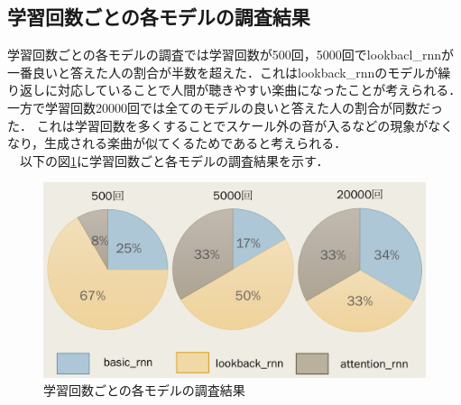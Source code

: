 \subsection{学習回数ごとの各モデルの調査結果}
学習回数ごとの各モデルの調査では学習回数が500回，5000回でlookbacl\_rnnが一番良いと答えた人の割合が半数を超えた．これはlookback\_rnnのモデルが繰り返しに対応していることで人間が聴きやすい楽曲になったことが考えられる．一方で学習回数20000回では全てのモデルの良いと答えた人の割合が同数だった．
これは学習回数を多くすることでスケール外の音が入るなどの現象がなくなり，生成される楽曲が似てくるためであると考えられる．\\
　以下の図\ref{fig:学習回数ごと各モデルの調査結果}に学習回数ごと各モデルの調査結果を示す．
\begin{figure}[h]
    \begin{screen}
    \begin{center}
        \includegraphics[scale=0.6, clip]{./img/glaph1.png}
        \caption{学習回数ごとの各モデルの調査結果}
        \label{fig:学習回数ごと各モデルの調査結果}
    \end{center}
    \end{screen}
\end{figure}
\newpage
